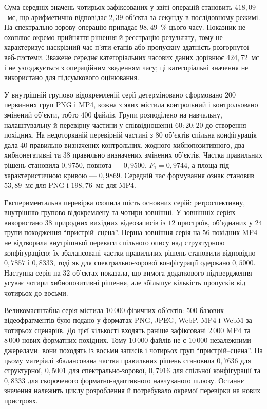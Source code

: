 Сума середніх значень чотирьох зафіксованих у звіті операцій становить $418{,}09$~мс, що арифметично відповідає $2{,}39$ об’єкта за секунду в послідовному режимі. На спектрально-зорову операцію припадає $98{,}49$~\% цього часу. Показник не охоплює окремо прийняття рішення й реєстрацію результату, тому не характеризує наскрізний час п’яти етапів або пропускну здатність розгорнутої веб-системи. Зважене середнє категоріальних часових даних дорівнює $424{,}72$~мс і не узгоджується з операційним зведенням часу; ці категоріальні значення не використано для підсумкового оцінювання.

У внутрішній групово відокремленій серії детерміновано сформовано $200$ первинних груп PNG і MP4, кожна з яких містила контрольний і контрольовано змінений об’єкти, тобто $400$ файлів. Групи розподілено на навчальну, налаштувальну й перевірну частини у співвідношенні $60:20:20$ до створення похідних. На недоторканій перевірній частині з $80$ об’єктів спільна конфігурація дала $40$ правильно визначених контрольних, жодного хибнопозитивного, два хибнонегативні та $38$ правильно визначених змінених об’єктів. Частка правильних рішень становила $0{,}9750$, повнота --- $0{,}9500$, $F_1=0{,}9744$, а площа під характеристичною кривою --- $0{,}9869$. Середній час формування ознак становив $53{,}89$~мс для PNG і $198{,}76$~мс для MP4.

Експериментальна перевірка охопила шість основних серій: ретроспективну, внутрішню групово відокремлену та чотири зовнішні. У зовнішніх серіях використано $38$ природних вихідних відеозаписів із $12$ пристроїв, об’єднаних у $24$ групи походження ``пристрій--сцена''. Перша зовнішня серія на $56$ похідних MP4 не відтворила внутрішньої переваги спільного опису над структурною конфігурацією: їх збалансовані частки правильних рішень становили відповідно $0{,}7857$ і $0{,}8333$, тоді як для спектрально-зорової конфігурації одержано $0{,}5000$. Наступна серія на $32$ об’єктах показала, що вимога додаткового підтвердження усуває чотири хибнопозитивні рішення, але збільшує кількість пропусків від чотирьох до восьми.

Великомасштабна серія містила $10\,000$ фізичних об’єктів: $500$ базових відеофрагментів було подано у форматах PNG, JPEG, WebP, MP4 і WebM за чотирьох сценаріїв. До цієї кількості входять раніше зафіксовані $2\,000$ MP4 та $8\,000$ нових форматних похідних. Тому $10\,000$ файлів не є $10\,000$ незалежними джерелами: вони походять із восьми записів і чотирьох груп ``пристрій--сцена''. На цьому матеріалі збалансована частка правильних рішень становила $0{,}7636$ для структурної, $0{,}5001$ для спектрально-зорової, $0{,}7916$ для спільної конфігурації та $0{,}8333$ для скороченого форматно-адаптивного навчуваного шлюзу. Останнє значення належить циклу розроблення й потребувало окремої перевірки на нових пристроях.

